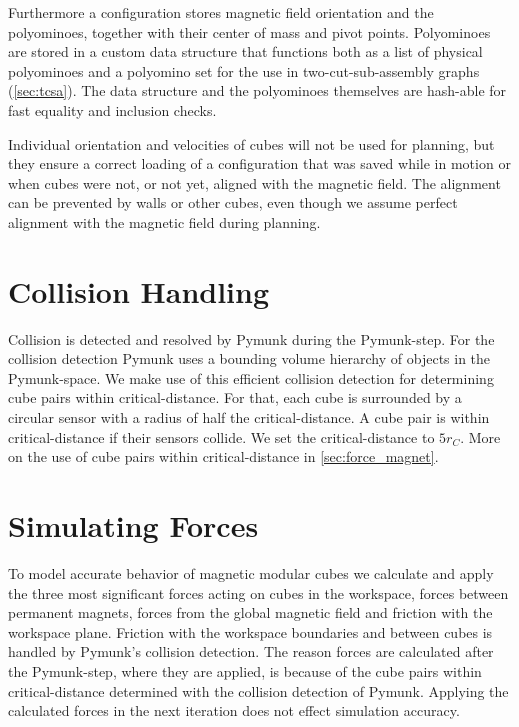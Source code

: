 Furthermore a configuration stores magnetic field orientation and the polyominoes, together with their center of mass and pivot points.
Polyominoes are stored in a custom data structure that functions both as a list of physical polyominoes and a polyomino set for the use in two-cut-sub-assembly graphs (\autoref{sec:tcsa}).
The data structure and the polyominoes themselves are hash-able for fast equality and inclusion checks.

Individual orientation and velocities of cubes will not be used for planning, but they ensure a correct loading of a configuration that was saved while in motion or when cubes were not, or not yet, aligned with the magnetic field.
The alignment can be prevented by walls or other cubes, even though we assume perfect alignment with the magnetic field during planning.


\section{Collision Handling}
\label{sec:coll_handling}

Collision is detected and resolved by Pymunk during the Pymunk-step.
For the collision detection Pymunk uses a bounding volume hierarchy of objects in the Pymunk-space.
We make use of this efficient collision detection for determining cube pairs within critical-distance.
For that, each cube is surrounded by a circular sensor with a radius of half the critical-distance.
A cube pair is within critical-distance if their sensors collide.
We set the critical-distance to $5 r_C$.
More on the use of cube pairs within critical-distance in \autoref{sec:force_magnet}.

\section{Simulating Forces}

To model accurate behavior of magnetic modular cubes we calculate and apply the three most significant forces acting on cubes in the workspace, forces between permanent magnets, forces from the global magnetic field and friction with the workspace plane.
Friction with the workspace boundaries and between cubes is handled by Pymunk's collision detection.
The reason forces are calculated after the Pymunk-step, where they are applied, is because of the cube pairs within critical-distance determined with the collision detection of Pymunk.
Applying the calculated forces in the next iteration does not effect simulation accuracy.

